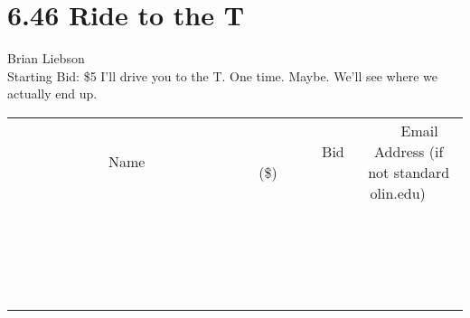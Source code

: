 \documentclass[11pt]{article}
\begin{document}
\section*{6.46 Ride to the T}
Brian Liebson
\\
Starting Bid: \$5
\newline
I'll drive you to the T. One time. Maybe. We'll see where we actually end up.
\\[3ex]
\begin{tabular}{c c c}
~~~~~~~~~~~~~Name~~~~~~~~~~~~~ & ~~~~~~~~~Bid (\$)~~~~~~~~~  & ~~~Email Address (if not standard olin.edu)~~~\\
 & & \\
\hline
 & & \\
\hline
 & & \\
\hline
 & & \\
\hline
 & & \\
\hline
 & & \\
\hline
 & & \\
\hline
 & & \\
\hline
 & & \\
\hline
 & & \\
\hline
 & & \\
\hline
 & & \\
\hline
 & & \\
\hline
 & & \\
\hline
 & & \\
\hline
 & & \\
\hline
 & & \\
\hline
 & & \\
\hline
 & & \\
\hline
\end{tabular}
\newpage
\end{document}
